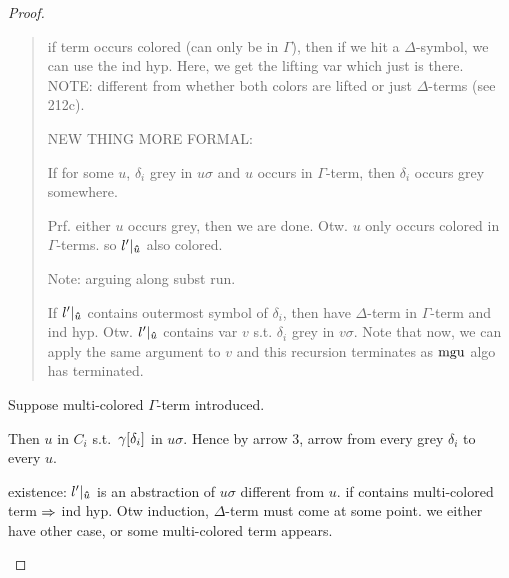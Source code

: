 \documentclass[,%
	draft=false,%
	numbers=noendperiod
	11pt,
	a4paper,
	oneside,%
	openany,
]{memoir}
\begin{document}
\begin{proof}
\begin{description}
\begin{quote}
				if term occurs colored (can only be in $\Gamma$), then if we hit a $\Delta$-symbol, we can use the ind hyp.
				Here, we get the lifting var which just is there. NOTE: different from whether both colors are lifted or just $\Delta$-terms (see 212c).

				\bigskip

				NEW THING MORE FORMAL:

				If for some $u$, $\delta_i$ grey in $u\sigma$ and $u$ occurs in $\Gamma$-term, then $\delta_i$ occurs grey somewhere.

				Prf. 
				either $u$ occurs grey, then we are done.
				Otw. $u$ only occurs colored in $\Gamma$-terms.
				so $l'|_{\bm\hat u}$ also colored.

				Note: arguing along subst run.

				If $l'|_{\bm\hat u}$ contains outermost symbol of $\delta_i$, then have $\Delta$-term in $\Gamma$-term and ind hyp.
				Otw. $l'|_{\bm\hat u}$ contains var $v$ s.t. $\delta_i$ grey in $v\sigma$.
				Note that now, we can apply the same argument to $v$ and this recursion terminates as $\operatorname{mgu}$ algo has terminated.


			\end{quote}


		\item{} Suppose multi-colored $\Gamma$-term introduced.

			Then $u$ in $C_i$ s.t.\ $\gamma[\delta_i]$ in $u\sigma$.
			Hence by arrow 3, arrow from every grey $\delta_i$ to every $u$.

			existence:
			$l'|_{\bm\hat u}$ is an abstraction of $u\sigma$ different from $u$.
			if contains multi-colored term $\Rightarrow$ ind hyp.
			Otw induction, $\Delta$-term must come at some point.
			we either have other case, or some multi-colored term appears.






	\end{description}

\end{proof}
\end{document}
